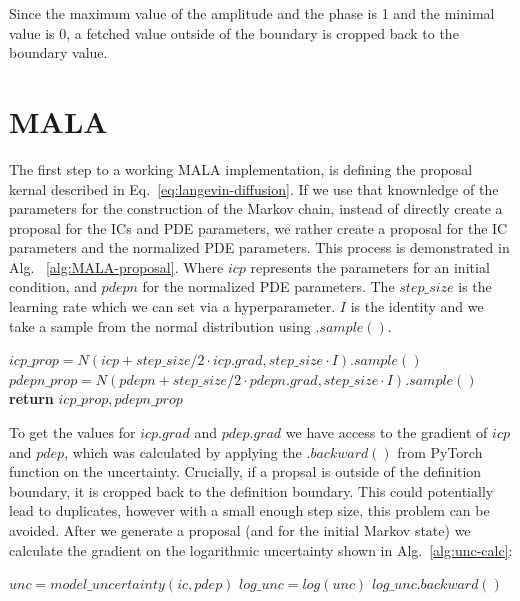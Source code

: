 Since the maximum value of the amplitude and the phase is 1 and the minimal value is 0, a fetched value outside of the boundary is cropped back to the boundary value.



\section{MALA}
The first step to a working MALA implementation, is defining the proposal kernal described in Eq.~\ref{eq:langevin-diffusion}. 
If we use that knownledge of the parameters for the construction of the Markov chain, instead of directly create a proposal for the ICs and PDE parameters, we rather create a proposal for the IC parameters and the normalized PDE parameters.
This process is demonstrated in Alg. ~\ref{alg:MALA-proposal}. Where $icp$ represents the parameters for an initial condition, and $pdepn$ for the normalized PDE parameters. The $step\_size$ is the learning rate which we can set via a hyperparameter. $I$ is the identity and we take a sample from the normal distribution using $.sample()$.
\begin{Algorithmus}
    \caption{MALA proposal generation}
    \label{alg:MALA-proposal}
    \begin{algorithmic}[1] 
            \State $icp\_prop = N(icp + step\_size/2\cdot icp.grad, step\_size\cdot I).sample()$
            \State $pdepn\_prop = N(pdepn + step\_size/2\cdot pdepn.grad, step\_size\cdot I).sample()$
            \State \textbf{return} $icp\_prop, pdepn\_prop$
        \EndFunction
    \end{algorithmic}
\end{Algorithmus}

To get the values for $icp.grad$ and $pdep.grad$ we have access to the gradient of $icp$ and $pdep$, which was calculated by applying the $.backward()$ from PyTorch function on the uncertainty. Crucially, if a propsal is outside of the definition boundary, it is cropped back to the definition boundary. This could potentially lead to duplicates, however with a small enough step size, this problem can be avoided.
After we generate a proposal (and for the initial Markov state) we calculate the gradient on the logarithmic uncertainty shown in Alg.~\ref{alg:unc-calc}:
  
\begin{Algorithmus}
    \caption{Uncertainty gradient evaluation}
    \label{alg:unc-calc}
    \begin{algorithmic}[1] 
            \State $unc = model\_uncertainty(ic, pdep)$
            \State $log\_unc = log(unc)$
            \State $log\_unc.backward()$
        \EndFunction
    \end{algorithmic}
\end{Algorithmus}

